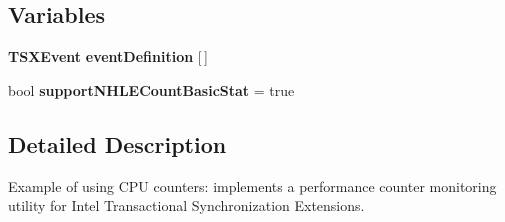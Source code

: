 \subsection*{Variables}
\begin{DoxyCompactItemize}
\item 
\mbox{\label{pcm-tsx_8cpp_af6afa6575f1849ca84ef80ff04ba6e0a}} 
\textbf{ T\+S\+X\+Event} {\bfseries event\+Definition} [$\,$]
\item 
\mbox{\label{pcm-tsx_8cpp_a4f5c42c20485730abf26cf43b4a960b7}} 
bool {\bfseries support\+N\+H\+L\+E\+Count\+Basic\+Stat} = true
\end{DoxyCompactItemize}


\subsection{Detailed Description}
Example of using C\+PU counters\+: implements a performance counter monitoring utility for Intel Transactional Synchronization Extensions. 

